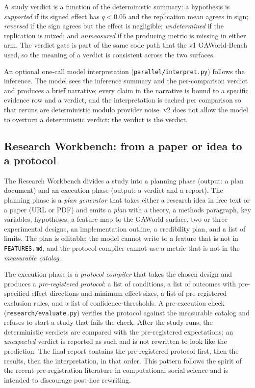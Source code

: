 A study verdict is a function of the deterministic summary: a hypothesis is
\emph{supported} if its signed effect has $q<0.05$ and the replication mean
agrees in sign; \emph{reversed} if the sign agrees but the effect is
negligible; \emph{undetermined} if the replication is mixed; and
\emph{unmeasured} if the producing metric is missing in either arm.
The verdict gate is part of the same code path that the v1 GAWorld-Bench
used, so the meaning of a verdict is consistent across the two surfaces.

An optional one-call model interpretation (\texttt{parallel/interpret.py})
follows the inference.  The model sees the inference summary and the
per-comparison verdict and produces a brief narrative; every claim in the
narrative is bound to a specific evidence row and a verdict, and the
interpretation is cached per comparison so that reruns are deterministic
modulo provider noise.  v2 does not allow the model to overturn a
deterministic verdict: the verdict is the verdict.

\subsection{Research Workbench: from a paper or idea to a protocol}

The Research Workbench \citep{gaworldbench} divides a study into a planning
phase (output: a plan document) and an execution phase (output: a verdict
and a report).  The planning phase is a \emph{plan generator} that takes
either a research idea in free text or a paper (URL or PDF) and emits a
\emph{plan} with a theory, a methods paragraph, key variables, hypotheses,
a feature map to the GAWorld surface, two or three experimental designs,
an implementation outline, a credibility plan, and a list of limits.  The
plan is editable; the model cannot write to a feature that is not in
\texttt{FEATURES.md}, and the protocol compiler cannot use a metric that
is not in the \emph{measurable catalog}.

The execution phase is a \emph{protocol compiler} that takes the chosen
design and produces a \emph{pre-registered protocol}: a list of
conditions, a list of outcomes with pre-specified effect directions and
minimum effect sizes, a list of pre-registered exclusion rules, and a
list of confidence-thresholds.  A pre-execution check
(\texttt{research/evaluate.py}) verifies the protocol against the
measurable catalog and refuses to start a study that fails the check.
After the study runs, the deterministic verdicts are compared with the
pre-registered expectations; an \emph{unexpected} verdict is reported as
such and is not rewritten to look like the prediction.  The final
report contains the pre-registered protocol first, then the results,
then the interpretation, in that order.  This pattern follows the
spirit of the recent pre-registration literature in computational
social science and is intended to discourage post-hoc rewriting.

